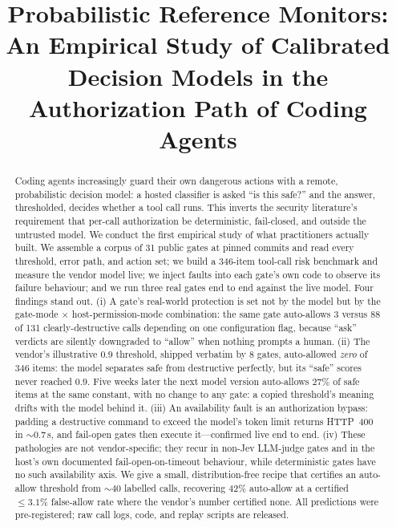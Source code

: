 \documentclass[conference]{IEEEtran}
\begin{document}
\title{Probabilistic Reference Monitors: An Empirical Study of Calibrated Decision Models in the Authorization Path of Coding Agents}

\author{\IEEEauthorblockN{\textcolor{red}{TODO: author names}}
\IEEEauthorblockA{\textcolor{red}{TODO: affiliation, email}}}

\maketitle

\begin{abstract}
Coding agents increasingly guard their own dangerous actions with a remote,
probabilistic decision model: a hosted classifier is asked ``is this safe?'' and the
answer, thresholded, decides whether a tool call runs. This inverts the security
literature's requirement that per-call authorization be deterministic, fail-closed, and
outside the untrusted model. We conduct the first empirical study of what practitioners
actually built. We assemble a corpus of 31 public gates at pinned commits and read every
threshold, error path, and action set; we build a 346-item tool-call risk benchmark and
measure the vendor model live; we inject faults into each gate's own code to observe its
failure behaviour; and we run three real gates end to end against the live model. Four
findings stand out. (i) A gate's real-world protection is set not by the model but by the
gate-mode $\times$ host-permission-mode combination: the same gate auto-allows 3 versus 88
of 131 clearly-destructive calls depending on one configuration flag, because ``ask''
verdicts are silently downgraded to ``allow'' when nothing prompts a human. (ii) The
vendor's illustrative $0.9$ threshold, shipped verbatim by 8 gates, auto-allowed \emph{zero}
of 346 items: the model separates safe from destructive perfectly, but its ``safe'' scores
never reached $0.9$. Five weeks later the next model version auto-allows 27\% of safe items at
the same constant, with no change to any gate: a copied threshold's meaning drifts with the
model behind it. (iii) An availability fault is an authorization bypass: padding a
destructive command to exceed the model's token limit returns HTTP~400 in ${\sim}0.7$\,s,
and fail-open gates then execute it---confirmed live end to end. (iv) These pathologies are
not vendor-specific; they recur in non-Jev LLM-judge gates and in the host's own
documented fail-open-on-timeout behaviour, while deterministic gates have no such
availability axis. We give a small, distribution-free recipe that certifies an auto-allow
threshold from ${\sim}40$ labelled calls, recovering 42\% auto-allow at a certified
$\leq 3.1\%$ false-allow rate where the vendor's number certified none. All predictions
were pre-registered; raw call logs, code, and replay scripts are released.
\end{abstract}
\end{document}
